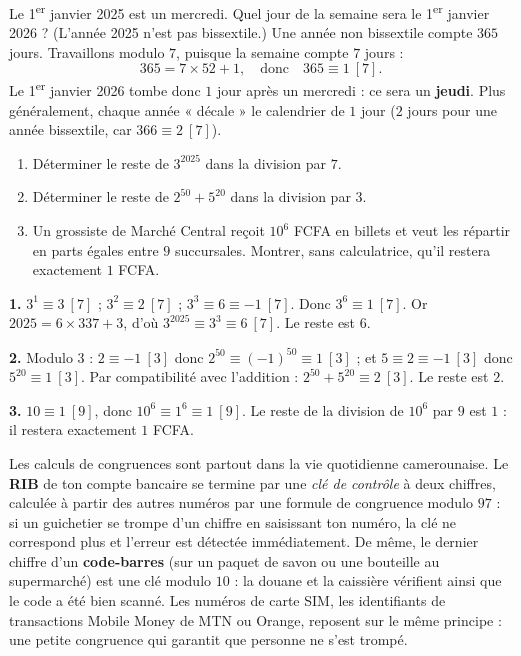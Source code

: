 \documentclass[11pt]{article}
\begin{document}
\begin{exoresolu}
Le 1\textsuperscript{er} janvier 2025 est un mercredi. Quel jour de la semaine sera le 1\textsuperscript{er} janvier 2026 ? (L'année 2025 n'est pas bissextile.)
\tcblower
Une année non bissextile compte $365$ jours. Travaillons modulo $7$, puisque la semaine compte $7$ jours :
\[ 365 = 7 \times 52 + 1, \quad \text{donc} \quad 365 \equiv 1 \ [7]. \]
Le 1\textsuperscript{er} janvier 2026 tombe donc $1$ jour après un mercredi : ce sera un \textbf{jeudi}. Plus généralement, chaque année « décale » le calendrier de $1$ jour ($2$ jours pour une année bissextile, car $366 \equiv 2 \ [7]$).
\end{exoresolu}

\begin{exercice}
\begin{enumerate}
\item Déterminer le reste de $3^{2025}$ dans la division par $7$.
\item Déterminer le reste de $2^{50} + 5^{20}$ dans la division par $3$.
\item Un grossiste de Marché Central reçoit $10^{6}$ FCFA en billets et veut les répartir en parts égales entre $9$ succursales. Montrer, sans calculatrice, qu'il restera exactement $1$ FCFA.
\end{enumerate}
\end{exercice}

\begin{corrige}
\textbf{1.} $3^1 \equiv 3 \ [7]$ ; $3^2 \equiv 2 \ [7]$ ; $3^3 \equiv 6 \equiv -1 \ [7]$. Donc $3^6 \equiv 1 \ [7]$. Or $2025 = 6 \times 337 + 3$, d'où $3^{2025} \equiv 3^3 \equiv 6 \ [7]$. Le reste est $6$.

\textbf{2.} Modulo $3$ : $2 \equiv -1 \ [3]$ donc $2^{50} \equiv (-1)^{50} \equiv 1 \ [3]$ ; et $5 \equiv 2 \equiv -1 \ [3]$ donc $5^{20} \equiv 1 \ [3]$. Par compatibilité avec l'addition : $2^{50} + 5^{20} \equiv 2 \ [3]$. Le reste est $2$.

\textbf{3.} $10 \equiv 1 \ [9]$, donc $10^{6} \equiv 1^{6} \equiv 1 \ [9]$. Le reste de la division de $10^{6}$ par $9$ est $1$ : il restera exactement $1$ FCFA.
\end{corrige}

\begin{savaistu}
Les calculs de congruences sont partout dans la vie quotidienne camerounaise. Le \textbf{RIB} de ton compte bancaire se termine par une \emph{clé de contrôle} à deux chiffres, calculée à partir des autres numéros par une formule de congruence modulo $97$ : si un guichetier se trompe d'un chiffre en saisissant ton numéro, la clé ne correspond plus et l'erreur est détectée immédiatement. De même, le dernier chiffre d'un \textbf{code-barres} (sur un paquet de savon ou une bouteille au supermarché) est une clé modulo $10$ : la douane et la caissière vérifient ainsi que le code a été bien scanné. Les numéros de carte SIM, les identifiants de transactions Mobile Money de MTN ou Orange, reposent sur le même principe : une petite congruence qui garantit que personne ne s'est trompé.
\end{savaistu}
\end{document}
